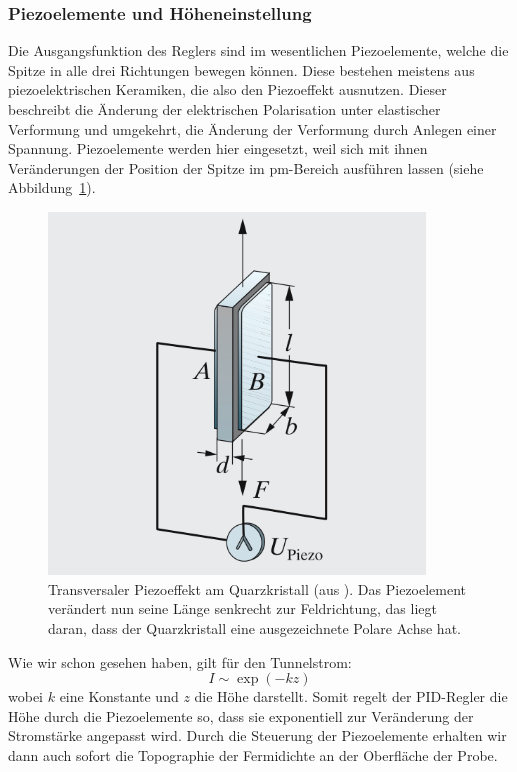 \subsubsection{Piezoelemente und Höheneinstellung}
Die Ausgangsfunktion des Reglers sind im wesentlichen Piezoelemente, welche die Spitze in alle
drei Richtungen bewegen können. Diese bestehen meistens aus piezoelektrischen Keramiken, die also
den Piezoeffekt ausnutzen. Dieser beschreibt die Änderung der elektrischen Polarisation
unter elastischer Verformung und umgekehrt, die Änderung der Verformung durch Anlegen einer
Spannung. Piezoelemente werden hier eingesetzt, weil sich mit ihnen Veränderungen der Position
der Spitze im pm-Bereich ausführen lassen (siehe Abbildung~\ref{fig:piezoeffekt}).
\begin{figure}[h]
\includegraphics[width=10cm]{pics/piezoeffekt}
\caption{Transversaler Piezoeffekt am Quarzkristall (aus \cite{vogel1997gerthsen}).
Das Piezoelement verändert nun seine Länge senkrecht zur Feldrichtung, das liegt daran, dass der
Quarzkristall eine ausgezeichnete Polare Achse hat.
}
\label{fig:piezoeffekt}
\end{figure}
Wie wir schon gesehen haben, gilt für den Tunnelstrom:
\begin{equation}
I \sim \exp(-kz)
\end{equation}
wobei $k$ eine Konstante und $z$ die Höhe darstellt. Somit regelt der PID-Regler die Höhe durch
die Piezoelemente so, dass sie exponentiell zur Veränderung der Stromstärke angepasst wird.
Durch die Steuerung der Piezoelemente erhalten wir dann auch sofort die Topographie der
Fermidichte an der Oberfläche der Probe.

